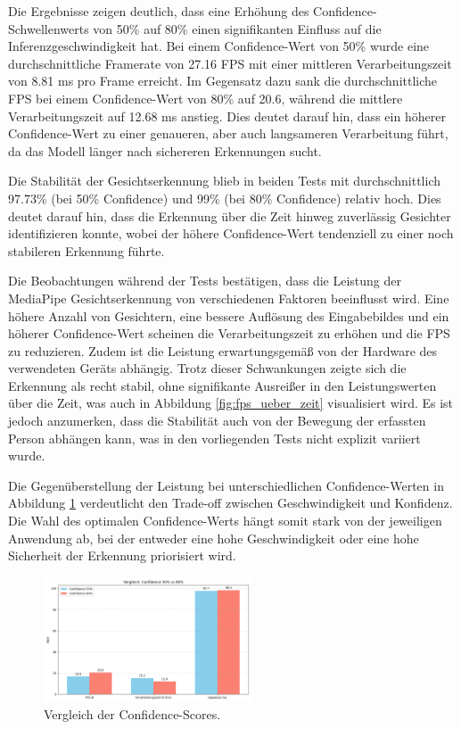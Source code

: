 Die Ergebnisse zeigen deutlich, dass eine Erhöhung des Confidence-Schwellenwerts von 50\% auf 80\% einen signifikanten Einfluss auf die Inferenzgeschwindigkeit hat. Bei einem Confidence-Wert von 50\% wurde eine durchschnittliche Framerate von 27.16 FPS mit einer mittleren Verarbeitungszeit von 8.81 ms pro Frame erreicht. Im Gegensatz dazu sank die durchschnittliche FPS bei einem Confidence-Wert von 80\% auf 20.6, während die mittlere Verarbeitungszeit auf 12.68 ms anstieg. Dies deutet darauf hin, dass ein höherer Confidence-Wert zu einer genaueren, aber auch langsameren Verarbeitung führt, da das Modell länger nach sichereren Erkennungen sucht.

Die Stabilität der Gesichtserkennung blieb in beiden Tests mit durchschnittlich 97.73\% (bei 50\% Confidence) und 99\% (bei 80\% Confidence) relativ hoch. Dies deutet darauf hin, dass die Erkennung über die Zeit hinweg zuverlässig Gesichter identifizieren konnte, wobei der höhere Confidence-Wert tendenziell zu einer noch stabileren Erkennung führte.

Die Beobachtungen während der Tests bestätigen, dass die Leistung der MediaPipe Gesichtserkennung von verschiedenen Faktoren beeinflusst wird. Eine höhere Anzahl von Gesichtern, eine bessere Auflösung des Eingabebildes und ein höherer Confidence-Wert scheinen die Verarbeitungszeit zu erhöhen und die FPS zu reduzieren. Zudem ist die Leistung erwartungsgemäß von der Hardware des verwendeten Geräts abhängig. Trotz dieser Schwankungen zeigte sich die Erkennung als recht stabil, ohne signifikante Ausreißer in den Leistungswerten über die Zeit, was auch in Abbildung \ref{fig:fps_ueber_zeit} visualisiert wird. Es ist jedoch anzumerken, dass die Stabilität auch von der Bewegung der erfassten Person abhängen kann, was in den vorliegenden Tests nicht explizit variiert wurde.

Die Gegenüberstellung der Leistung bei unterschiedlichen Confidence-Werten in Abbildung \ref{fig:vergleich_confidence} verdeutlicht den Trade-off zwischen Geschwindigkeit und Konfidenz. Die Wahl des optimalen Confidence-Werts hängt somit stark von der jeweiligen Anwendung ab, bei der entweder eine hohe Geschwindigkeit oder eine hohe Sicherheit der Erkennung priorisiert wird.

\begin{figure}[ht]
    \centering
    \includegraphics[width=0.55\textwidth]{data/Vergleich_Confidence_50_vs_80.png}
    \caption{Vergleich der Confidence-Scores.}
    \label{fig:vergleich_confidence}
\end{figure}


